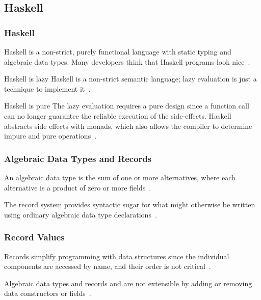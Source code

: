 \subsection{Haskell}
\begin{frame}\frametitle{Haskell}

Haskell is a non-strict, purely functional language with static typing and algebraic data types. Many developers think that Haskell programs look nice~\cite{history-of-haskell}.

\begin{block}{Haskell is lazy}
    Haskell is a non-strict semantic language; lazy evaluation is just a technique to implement it~\cite{history-of-haskell}.
\end{block}

\begin{block}{Haskell is pure}
The lazy evaluation requires a pure design since a function call can no longer guarantee the reliable execution of the side-effects. Haskell abstracts side effects with monads, which also allows the compiler to determine impure and pure operations~\cite{history-of-haskell}.
\end{block}

\end{frame}

\begin{frame}\frametitle{Algebraic Data Types and Records}

An algebraic data type is the sum of one or more alternatives, where each alternative is a product of zero or more fields~\cite{history-of-haskell}. 
        

The record system provides syntactic sugar for what might otherwise be written using ordinary algebraic data type declarations~\cite{lw-ext-records}. 


\end{frame}

\begin{frame}\frametitle{Record Values}

Records simplify programming with data structures since the individual components are accessed by name, and their order is not critical~\cite{lw-ext-records}.


Algebraic data types and records and are not extensible by adding or removing data constructors or fields~\cite{hlist,lw-ext-records,trees-that-grow}. 

\end{frame}

